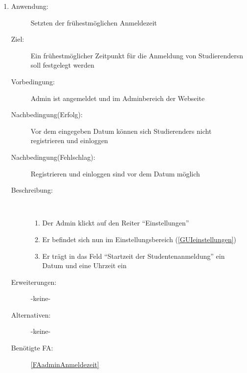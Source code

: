 \documentclass[parskip=full]{scrartcl}
\newcommand{\swtLabel}[1]{\textbf{/#1\arabic*0/}}
\begin{document}
\begin{enumerate} [label=\swtLabel{A}]
	\item \label{UCadminAnmeldezeit}
	\begin{description}
		\item[Anwendung:] Setzten der frühestmöglichen Anmeldezeit
		\item[Ziel:] Ein frühestmöglicher Zeitpunkt für die Anmeldung von \glspl{Studierender}n soll festgelegt werden
		\item[Vorbedingung:] \gls{Admin} ist angemeldet und im \gls{Admin}bereich der Webseite
		\item[Nachbedingung(Erfolg):] Vor dem eingegeben Datum können sich
		\glspl{Studierender} nicht registrieren und einloggen
		\item[Nachbedingung(Fehlschlag):] Registrieren und einloggen sind vor dem
		Datum möglich
		\item[Beschreibung:]~
		\begin{enumerate}[label=\arabic*.]
			\item Der \gls{Admin} klickt auf den Reiter \enquote{Einstellungen}
			\item Er befindet sich nun im Einstellungsbereich (\autoref{GUIeinstellungen})
			\item Er trägt in das Feld \enquote{Startzeit der Studentenanmeldung} ein
			Datum und eine Uhrzeit ein
		\end{enumerate}
		\item[Erweiterungen:] -keine-
		\item[Alternativen:] -keine-
		\item[Benötigte FA:] \ref{FAadminAnmeldezeit}
	\end{description}	
	

\end{enumerate}
\end{document}
